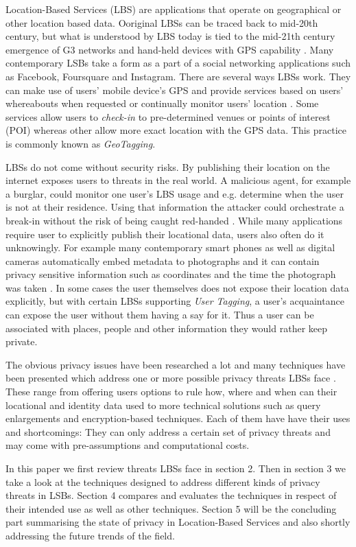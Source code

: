 \documentclass[english]{tktltiki2}
\theoremstyle{definition}
\theoremstyle{remark}
\begin{document}
Location-Based Services (LBS) are applications that operate on geographical or other location based data. Ooriginal LBSs can be traced back to mid-20th century, but what is understood by LBS today is tied to the mid-21th century emergence of G3 networks and hand-held devices with GPS capability \cite{History}. Many contemporary LSBs take a form as a part of a social networking applications such as Facebook, Foursquare and Instagram. There are several ways LBSs work. They can make use of users' mobile device's GPS and provide services based on users' whereabouts when requested or continually monitor users' location \cite{LocationPrivacy}. Some services allow users to \textit{check-in} to pre-determined venues or points of interest (POI) whereas other allow more exact location with the GPS data. This practice is commonly known as \textit{GeoTagging}. \par
LBSs do not come without security risks. By publishing their location on the internet exposes users to threats in the real world. A malicious agent, for example a burglar, could monitor one user's LBS usage and e.g. determine when the user is not at their residence. Using that information the attacker could orchestrate a break-in without the risk of being caught red-handed \cite{Friedland2010}. While many applications require user to explicitly publish their locational data, users also often do it unknowingly. For example many contemporary smart phones as well as digital cameras automatically embed metadata to photographs and it can contain privacy sensitive information such as coordinates and the time the photograph was taken \cite{Friedland2010}. In some cases the user themselves does not expose their location data explicitly, but with certain LBSs supporting \textit{User Tagging}, a user's acquaintance can expose the user without them having a say for it. Thus a user can be associated with places, people and other information they would rather keep private. \par
The obvious privacy issues have been researched a lot and many techniques have been presented which address one or more possible privacy threats LBSs face \cite{LocationPrivacy}. These range from offering users options to rule how, where and when can their locational and identity data used to more technical solutions such as query enlargements and encryption-based techniques. Each of them have have their uses and shortcomings: They can only address a certain set of privacy threats and may come with pre-assumptions and computational costs. \par 
In this paper we first review threats LBSs face in section 2. Then in section 3 we take a look at the techniques designed to address different kinds of privacy threats in LSBs. Section 4 compares and evaluates the techniques in respect of their intended use as well as other techniques. Section 5 will be the concluding part summarising the state of privacy in Location-Based Services and also shortly addressing the future trends of the field. 
\end{document}
